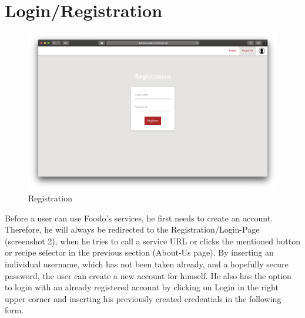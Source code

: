 \section*{Login/Registration}
\vspace{-2em}
\begin{figure}[H]
	\captionsetup{justification=centering}
	\begin{center}
		\includegraphics[scale=0.25]{Ressourcen/img/screenshots/screenshotD.png}
		\vspace{-3em}
		\caption{Registration}
	\end{center}
\end{figure}
Before a user can use Foodo’s services, he first needs to create an account. Therefore, he will always be redirected to the Registration/Login-Page (screenshot 2), when he tries to call a service URL or clicks the mentioned button or recipe selector in the previous section (About-Us page). By inserting an individual username, which has not been taken already, and a hopefully secure password, the user can create a new account for himself. He also has the option to login with an already registered account by clicking on Login in the right upper corner and inserting his previously created credentials in the following form.
